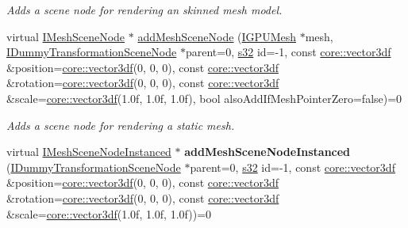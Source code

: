 \begin{DoxyCompactItemize}
\begin{DoxyCompactList}\small\item\em Adds a scene node for rendering an skinned mesh model. \end{DoxyCompactList}\item 
virtual \hyperlink{classirr_1_1scene_1_1IMeshSceneNode}{I\+Mesh\+Scene\+Node} $\ast$ \hyperlink{classirr_1_1scene_1_1ISceneManager_a38b254e43611c84a73c1302ced3816a8}{add\+Mesh\+Scene\+Node} (\hyperlink{classirr_1_1scene_1_1IMesh}{I\+G\+P\+U\+Mesh} $\ast$mesh, \hyperlink{classirr_1_1scene_1_1IDummyTransformationSceneNode}{I\+Dummy\+Transformation\+Scene\+Node} $\ast$parent=0, \hyperlink{namespaceirr_ac66849b7a6ed16e30ebede579f9b47c6}{s32} id=-\/1, const \hyperlink{namespaceirr_1_1core_a06f169d08b5c429f5575acb7edbad811}{core\+::vector3df} \&position=\hyperlink{namespaceirr_1_1core_a06f169d08b5c429f5575acb7edbad811}{core\+::vector3df}(0, 0, 0), const \hyperlink{namespaceirr_1_1core_a06f169d08b5c429f5575acb7edbad811}{core\+::vector3df} \&rotation=\hyperlink{namespaceirr_1_1core_a06f169d08b5c429f5575acb7edbad811}{core\+::vector3df}(0, 0, 0), const \hyperlink{namespaceirr_1_1core_a06f169d08b5c429f5575acb7edbad811}{core\+::vector3df} \&scale=\hyperlink{namespaceirr_1_1core_a06f169d08b5c429f5575acb7edbad811}{core\+::vector3df}(1.\+0f, 1.\+0f, 1.\+0f), bool also\+Add\+If\+Mesh\+Pointer\+Zero=false)=0
\begin{DoxyCompactList}\small\item\em Adds a scene node for rendering a static mesh. \end{DoxyCompactList}\item 
virtual \hyperlink{classirr_1_1scene_1_1IMeshSceneNodeInstanced}{I\+Mesh\+Scene\+Node\+Instanced} $\ast$ {\bfseries add\+Mesh\+Scene\+Node\+Instanced} (\hyperlink{classirr_1_1scene_1_1IDummyTransformationSceneNode}{I\+Dummy\+Transformation\+Scene\+Node} $\ast$parent=0, \hyperlink{namespaceirr_ac66849b7a6ed16e30ebede579f9b47c6}{s32} id=-\/1, const \hyperlink{namespaceirr_1_1core_a06f169d08b5c429f5575acb7edbad811}{core\+::vector3df} \&position=\hyperlink{namespaceirr_1_1core_a06f169d08b5c429f5575acb7edbad811}{core\+::vector3df}(0, 0, 0), const \hyperlink{namespaceirr_1_1core_a06f169d08b5c429f5575acb7edbad811}{core\+::vector3df} \&rotation=\hyperlink{namespaceirr_1_1core_a06f169d08b5c429f5575acb7edbad811}{core\+::vector3df}(0, 0, 0), const \hyperlink{namespaceirr_1_1core_a06f169d08b5c429f5575acb7edbad811}{core\+::vector3df} \&scale=\hyperlink{namespaceirr_1_1core_a06f169d08b5c429f5575acb7edbad811}{core\+::vector3df}(1.\+0f, 1.\+0f, 1.\+0f))=0\hypertarget{classirr_1_1scene_1_1ISceneManager_a8828efc58d2e2630ce14453978bfa710}{}\label{classirr_1_1scene_1_1ISceneManager_a8828efc58d2e2630ce14453978bfa710}


\end{DoxyCompactItemize}
